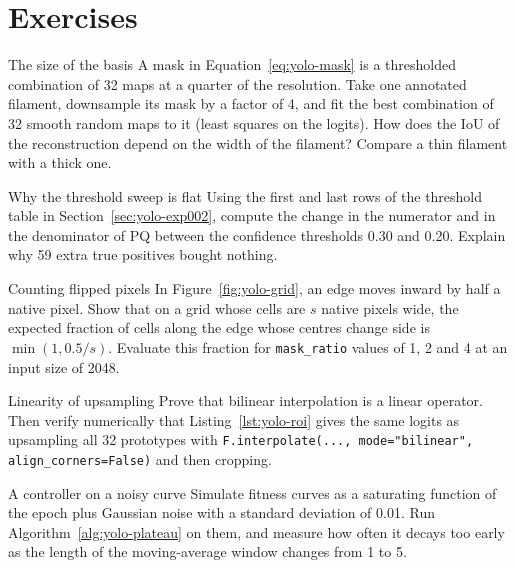 \section*{Exercises}
\begin{exercise}{The size of the basis}
A mask in Equation~\eqref{eq:yolo-mask} is a thresholded combination of 32 maps at a quarter of the
resolution. Take one annotated filament, downsample its mask by a factor of 4, and fit the best
combination of 32 smooth random maps to it (least squares on the logits). How does the IoU of the
reconstruction depend on the width of the filament? Compare a thin filament with a thick one.
\end{exercise}

\begin{exercise}{Why the threshold sweep is flat}
Using the first and last rows of the threshold table in Section~\ref{sec:yolo-exp002}, compute the
change in the numerator and in the denominator of PQ between the confidence thresholds 0.30 and
0.20. Explain why 59 extra true positives bought nothing.
\end{exercise}

\begin{exercise}{Counting flipped pixels}
In Figure~\ref{fig:yolo-grid}, an edge moves inward by half a native pixel. Show that on a grid whose
cells are $s$ native pixels wide, the expected fraction of cells along the edge whose centres change
side is $\min(1, 0.5/s)$. Evaluate this fraction for \texttt{mask\_ratio} values of 1, 2 and 4 at an
input size of 2048.
\end{exercise}

\begin{exercise}{Linearity of upsampling}
Prove that bilinear interpolation is a linear operator. Then verify numerically that
Listing~\ref{lst:yolo-roi} gives the same logits as upsampling all 32 prototypes with
\texttt{F.interpolate(..., mode="bilinear", align\_corners=False)} and then cropping.
\end{exercise}

\begin{exercise}{A controller on a noisy curve}
Simulate fitness curves as a saturating function of the epoch plus Gaussian noise with a standard
deviation of 0.01. Run Algorithm~\ref{alg:yolo-plateau} on them, and measure how often it decays too
early as the length of the moving-average window changes from 1 to 5.
\end{exercise}
